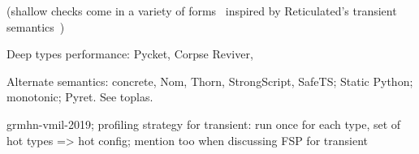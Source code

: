 (shallow
checks come in a variety of
forms~\cite{grmhn-vmil-2019,rmhn-ecoop-2019,glfd-pj-2022,lgmvpk-pj-2023}
inspired by Reticulated's transient
semantics~\cite{vksb-dls-2014,vss-popl-2017,v-thesis-2019})

Deep types performance: Pycket, Corpse Reviver,

Alternate semantics: concrete, Nom, Thorn, StrongScript, SafeTS;
Static Python; monotonic; Pyret. See toplas.

grmhn-vmil-2019;
profiling strategy for transient: run once for each type, set of hot types => hot config;
mention too when discussing FSP for transient

